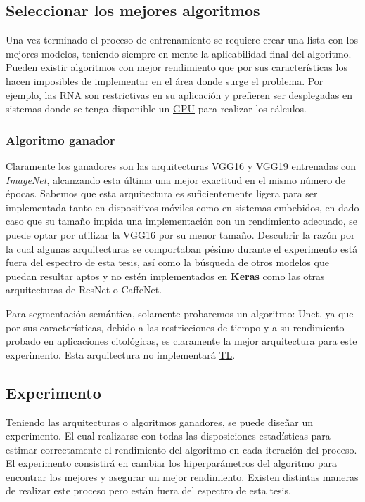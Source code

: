 \subsection{Seleccionar los mejores algoritmos}

Una vez terminado el proceso de entrenamiento se requiere crear una lista con
los mejores modelos, teniendo siempre en mente la aplicabilidad final del
algoritmo. Pueden existir algoritmos con mejor rendimiento que por sus
características los hacen imposibles de implementar en el área donde surge el
problema. Por ejemplo, las \hyperlink{abbr}{RNA} son restrictivas en su
aplicación y prefieren ser desplegadas en sistemas donde se tenga disponible un
\hyperlink{abbr}{GPU} para realizar los cálculos.

\subsubsection{Algoritmo ganador}

Claramente los ganadores son las arquitecturas VGG16 y VGG19 entrenadas con
\emph{ImageNet}, alcanzando esta última una mejor exactitud en el mismo número
de épocas. Sabemos que esta arquitectura es suficientemente ligera para ser
implementada tanto en dispositivos móviles como en sistemas embebidos, en dado
caso que su tamaño impida una implementación con un rendimiento adecuado, se
puede optar por utilizar la VGG16 por su menor tamaño. Descubrir la razón por la
cual algunas arquitecturas se comportaban pésimo durante el experimento está
fuera del espectro de esta tesis, así como la búsqueda de otros modelos que
puedan resultar aptos y no estén implementados en \textbf{Keras} como las otras
arquitecturas de ResNet o CaffeNet.

Para segmentación semántica, solamente probaremos un algoritmo: Unet, ya que por
sus características, debido a las restricciones de tiempo y a su rendimiento
probado en aplicaciones citológicas, es claramente la mejor arquitectura para
este experimento. Esta arquitectura no implementará \hyperlink{abbr}{TL}. 

\subsection{Experimento}

Teniendo las arquitecturas o algoritmos ganadores, se puede diseñar un
experimento. El cual realizarse con todas las disposiciones
estadísticas para estimar correctamente el rendimiento del algoritmo en cada
iteración del proceso. El experimento consistirá en cambiar los hiperparámetros
del algoritmo para encontrar los mejores y asegurar un mejor rendimiento.
Existen distintas maneras de realizar este proceso pero están fuera del espectro
de esta tesis.

